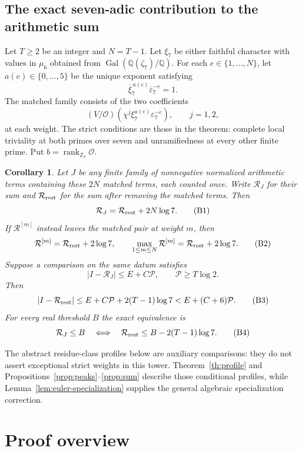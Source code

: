 \documentclass[11pt]{article}
\newtheorem{corollary}[theorem]{Corollary}
\newcommand{\Z}{\mathbb Z}\newcommand{\Q}{\mathbb Q}
\begin{document}
\subsection{The exact seven-adic contribution to the arithmetic sum}

Let $T\ge2$ be an integer and $N=T-1$. Let $\xi_7$ be either faithful character with values in $\mu_6$ obtained from $\operatorname{Gal}(\Q(\zeta_7)/\Q)$. For each $e\in\{1,\ldots,N\}$, let $a(e)\in\{0,\ldots,5\}$ be the unique exponent satisfying
\[
 \overline\xi_7^{\,a(e)}\overline\varepsilon_7^{-e}=1.
\]
The matched family consists of the two coefficients
\[
 (V/\mathcal O)(\chi^j\xi_7^{a(e)}\varepsilon_7^{-e}),\qquad j=1,2,
\]
at each weight. The strict conditions are those in the theorem: complete local triviality at both primes over seven and unramifiedness at every other finite prime. Put $b=\operatorname{rank}_{\Z_7}\mathcal O$.

\begin{corollary}\label{cor:seven-budget}
Let $J$ be any finite family of nonnegative normalized arithmetic terms containing these $2N$ matched terms, each counted once. Write $\mathcal R_J$ for their sum and $\mathcal R_{\rm rest}$ for the sum after removing the matched terms. Then
\[
 \mathcal R_J=\mathcal R_{\rm rest}+2N\log7.
 \tag{B1}
\]
If $\mathcal R^{[m]}$ instead leaves the matched pair at weight $m$, then
\[
 \mathcal R^{[m]}=\mathcal R_{\rm rest}+2\log7,
 \qquad
 \max_{1\le m\le N}\mathcal R^{[m]}
       =\mathcal R_{\rm rest}+2\log7.
 \tag{B2}
\]
Suppose a comparison on the same datum satisfies
\[
 |I-\mathcal R_J|\le E+C\mathcal P,
 \qquad \mathcal P\ge T\log2.
\]
Then
\[
 |I-\mathcal R_{\rm rest}|
 \le E+C\mathcal P+2(T-1)\log7
 < E+(C+6)\mathcal P.
 \tag{B3}
\]
For every real threshold $B$ the exact equivalence is
\[
 \mathcal R_J\le B
 \quad\Longleftrightarrow\quad
 \mathcal R_{\rm rest}\le B-2(T-1)\log7.
 \tag{B4}
\]
\end{corollary}

The abstract residue-class profiles below are auxiliary comparisons:
they do not assert exceptional strict weights in this tower.
Theorem~\ref{th:profile} and Propositions~\ref{prop:peaks}--\ref{prop:sum}
describe those conditional profiles, while
Lemma~\ref{lem:euler-specialization} supplies the general algebraic
specialization correction.

\section*{Proof overview}
\end{document}
